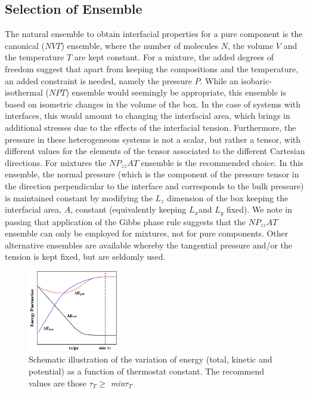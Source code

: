 \documentclass[9pt,bestpractices]{livecoms}
\begin{document}
\subsection{Selection of Ensemble}
\label{sec:ensemble}
The natural ensemble to obtain interfacial properties for a pure component is
the canonical ($NVT$) ensemble, where the number of molecules
$N$, the volume $V$ and the temperature $T$ are kept
constant\textit{.} For a mixture, the added degrees of freedom suggest that
apart from keeping the compositions and the temperature, an added constraint is
needed, namely the pressure $P$. While an isobaric-isothermal
($NPT$) ensemble would seemingly be appropriate, this ensemble is based
on isometric changes in the volume of the box. In the case of systems with
interfaces, this would amount to changing the interfacial area, which brings in
additional stresses due to the effects of the interfacial tension. Furthermore,
the pressure in these heterogeneous systems is not a scalar, but rather
a tensor, with different values for the elements of the tensor associated to
the different Cartesian directions.  For mixtures the
$NP_{zz}AT$ ensemble is the recommended choice. In this
ensemble, the normal pressure (which is the component of the pressure tensor in
the direction perpendicular to the interface and corresponds to the bulk
pressure) is maintained constant by modifying the $L_{z}$ dimension of
the box keeping the interfacial area, $A$, constant (equivalently
keeping $L_{x }$and $L_{y}$ fixed). We note in passing that
application of the Gibbs phase rule suggests that the
$NP_{zz}AT$ ensemble can only be employed for mixtures, not
for pure components. Other alternative ensembles are available
\citep{zhang1995} whereby the tangential pressure and/or the tension
is kept fixed, but are seldomly used.  


\begin{figure}
  \centering
\includegraphics[width=0.35\textwidth]{gfx/image25.png}
\caption{Schematic illustration of the variation of energy (total, kinetic and potential) as a function of thermostat constant. The recommend values are those ${\tau}_{ T}{\geq}$ \textit{min${\tau}$}$_{T}$}
\label{fig:5b}
\end{figure}
\end{document}
